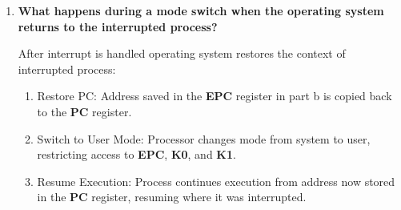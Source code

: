 \documentclass{article}
\begin{document}
\begin{enumerate}[label=\textbf{\alph*})]
    \item \textbf{What happens during a mode switch when the operating system returns to the interrupted process?}

    After interrupt is handled operating system restores the context of
    interrupted process:
    \begin{enumerate}
        \item Restore PC: Address saved in the \textbf{EPC} register in part b
        is copied back to the \textbf{PC} register.
        \item Switch to User Mode: Processor changes mode from system to user, restricting access to \textbf{EPC}, \textbf{K0}, and \textbf{K1}.
        \item Resume Execution: Process continues execution from  address now stored in the \textbf{PC} register, resuming where it was interrupted.
    \end{enumerate}
\end{enumerate}

\newpage


\end{document}
